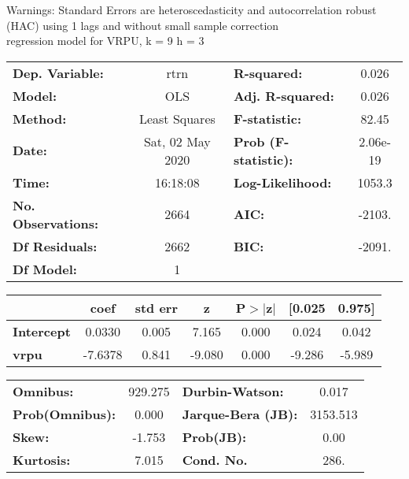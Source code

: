 Warnings: \newline
 [1] Standard Errors are heteroscedasticity and autocorrelation robust (HAC) using 1 lags and without small sample correction\\ 

regression model for VRPU, k = 9 h = 3\begin{center}
\begin{tabular}{lclc}
\toprule
\textbf{Dep. Variable:}    &       rtrn       & \textbf{  R-squared:         } &     0.026   \\
\textbf{Model:}            &       OLS        & \textbf{  Adj. R-squared:    } &     0.026   \\
\textbf{Method:}           &  Least Squares   & \textbf{  F-statistic:       } &     82.45   \\
\textbf{Date:}             & Sat, 02 May 2020 & \textbf{  Prob (F-statistic):} &  2.06e-19   \\
\textbf{Time:}             &     16:18:08     & \textbf{  Log-Likelihood:    } &    1053.3   \\
\textbf{No. Observations:} &        2664      & \textbf{  AIC:               } &    -2103.   \\
\textbf{Df Residuals:}     &        2662      & \textbf{  BIC:               } &    -2091.   \\
\textbf{Df Model:}         &           1      & \textbf{                     } &             \\
\bottomrule
\end{tabular}
\begin{tabular}{lcccccc}
                   & \textbf{coef} & \textbf{std err} & \textbf{z} & \textbf{P$> |$z$|$} & \textbf{[0.025} & \textbf{0.975]}  \\
\midrule
\textbf{Intercept} &       0.0330  &        0.005     &     7.165  &         0.000        &        0.024    &        0.042     \\
\textbf{vrpu}      &      -7.6378  &        0.841     &    -9.080  &         0.000        &       -9.286    &       -5.989     \\
\bottomrule
\end{tabular}
\begin{tabular}{lclc}
\textbf{Omnibus:}       & 929.275 & \textbf{  Durbin-Watson:     } &    0.017  \\
\textbf{Prob(Omnibus):} &   0.000 & \textbf{  Jarque-Bera (JB):  } & 3153.513  \\
\textbf{Skew:}          &  -1.753 & \textbf{  Prob(JB):          } &     0.00  \\
\textbf{Kurtosis:}      &   7.015 & \textbf{  Cond. No.          } &     286.  \\
\bottomrule
\end{tabular}
\end{center}

